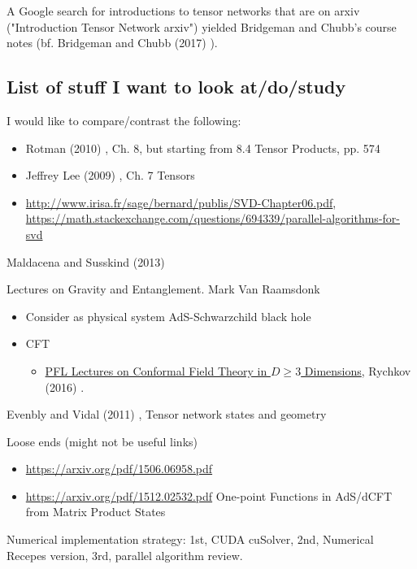 A Google search for introductions to tensor networks that are on arxiv ("Introduction Tensor Network arxiv") yielded Bridgeman and Chubb's course notes (bf. Bridgeman and Chubb (2017) \cite{agat:BrCh2017}).    

\subsection{List of stuff I want to look at/do/study}  
I would like to compare/contrast the following:  
\begin{itemize}
\item Rotman (2010) \cite{agat:JRotman2010}, Ch. 8, but starting from 8.4 Tensor Products, pp. 574  
\item Jeffrey Lee (2009) \cite{agat:JLee2009}, Ch. 7 Tensors 
\item \url{http://www.irisa.fr/sage/bernard/publis/SVD-Chapter06.pdf}, \url{https://math.stackexchange.com/questions/694339/parallel-algorithms-for-svd}
\end{itemize}



Maldacena and Susskind (2013) \cite{agat:MaSu2013}  

Lectures on Gravity and Entanglement.  Mark Van Raamsdonk  \cite{agat:Raam2016}

\begin{itemize}
\item Consider as physical system AdS-Schwarzchild black hole   
\item CFT 
\begin{itemize}
\item \href{https://arxiv.org/pdf/1601.05000.pdf}{PFL Lectures on Conformal Field Theory in $D\geq 3$ Dimensions}, Rychkov (2016) \cite{agat:Rych2016}.  
\end{itemize}
\end{itemize}

Evenbly and Vidal (2011) \cite{agat:EvVi2011}, Tensor network states and geometry

Loose ends (might not be useful links)
\begin{itemize}
\item \url{https://arxiv.org/pdf/1506.06958.pdf}
\item \url{https://arxiv.org/pdf/1512.02532.pdf} One-point Functions in AdS/dCFT from Matrix Product States
\end{itemize}

Numerical implementation strategy: 1st, CUDA cuSolver, 2nd, Numerical Recepes version, 3rd, parallel algorithm review.


